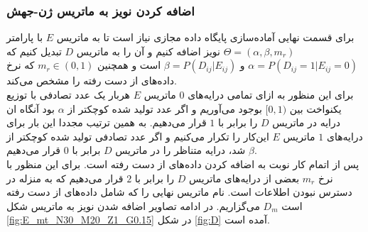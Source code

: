 \subsubsection{اضافه کردن نویز به ماتریس ژن-جهش}
برای قسمت نهایی آماده‌سازی پایگاه داده مجازی نیاز است تا به ماتریس $E$ با پارامتر $\Theta=(\alpha, \beta, m_r)$ نویز اضافه کنیم و آن را به ماتریس $D$ تبدیل کنیم که $\alpha=P(D_{ij}=1|E_{ij}=0)$ و $\beta=P(D_{ij}|E_{ij})$ است و همچنین $m_r\in(0,1)$ که نرخ داده‌های از دست رفته را مشخص می‌کند.
\\
برای این منظور به ازای تمامی درایه‌های $0$ ماتریس $E$ هربار یک عدد تصادفی با توزیع یکنواخت بین $[0,1)$ بوجود می‌آوریم و اگر عدد تولید شده کوچکتر از $\alpha$ بود آنگاه ان درایه در ماتریس $D$ را برابر با $1$ قرار می‌دهیم. به همین ترتیب مجددا این بار برای درایه‌های $1$ ماتریس $E$ این‌کار را تکرار می‌کنیم و اگر عدد تصادفی تولید شده کوچکتر از $\beta$ شد، درایه متناظر را در ماتریس $D$ برابر با $0$ قرار می‌دهیم.
\\
پس از اتمام کار نوبت به اضافه کردن داده‌های از دست رفته است. برای این منظور با نرخ $m_r$ بعضی از درایه‌های ماتریس $D$ را برابر با $2$ قرار می‌دهیم که به منزله در دسترس نبودن اطلاعات است. نام ماتریس نهایی را که شامل داده‌های از دست رفته است $D_m$ می‌گزاریم. در ادامه تصاویر اضافه شدن نویز به ماتریس شکل \ref{fig:E_mt_N30_M20_Z1_G0.15} در شکل \ref{fig:D} آمده است.
